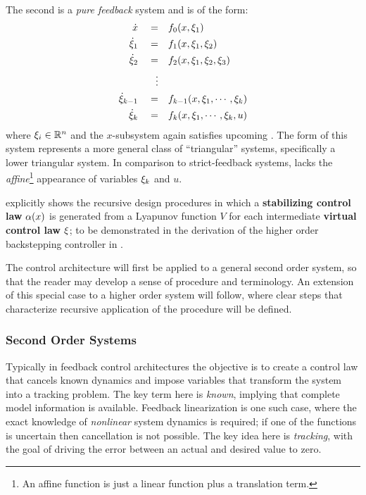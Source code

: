 \documentclass[12pt]{ucthesis}
\begin{document}
\begin{defn} \label{defn: pure_fb} ~\\
The second is a \textit{pure feedback} system and is of the form:
	\begin{equation} \label{eq: sys_pure_fb}
		\begin{aligned}
			\dot{x} 			\quad =& \quad  	f_0(x,\xi_1)  				\\
			\dot{\xi}_1 		\quad =& \quad  	f_1(x,\xi_1,\xi_2)  				\\
			\dot{\xi}_2 		\quad =& \quad 		f_2(x,\xi_1,\xi_2,\xi_3)  		\\
								\quad \vdots  													\\
			\dot{\xi}_{k-1}  	\quad =& \quad  	f_{k-1}(x,\xi_1,\cdots,\xi_k)  	\\
			\dot{\xi}_{k} 	\quad =& \quad  	f_k(x,\xi_1,\cdots,\xi_{k},u)
		\end{aligned}
	\end{equation}
where $\xi_i \in \mathbb{R}^n$ and the $x$-subsystem again satisfies upcoming . The form of this system represents a more general class of ``triangular'' systems, specifically a lower triangular system. In comparison to strict-feedback systems,  lacks the \textit{affine}\footnote{An affine function is just a linear function plus a translation term.} appearance of variables $\xi_k$ and $u$. 
\end{defn}

\citet[Sec. 2.3]{Krstic95} explicitly shows the recursive design procedures in which a \textbf{stabilizing control law} $\alpha(x)$ is generated from a Lyapunov function $V$ for each intermediate \textbf{virtual control law} $\xi$; to be demonstrated in the derivation of the higher order backstepping controller in .

The control architecture will first be applied to a general second order system, so that the reader may develop a sense of procedure and terminology. An extension of this special case to a higher order system will follow, where clear steps that characterize recursive application of the procedure will be defined.

\subsubsection{Second Order Systems}
\label{subsub: backstep_second}
Typically in feedback control architectures the objective is to create a control law that cancels known dynamics and impose variables that transform the system into a tracking problem. The key term here is \textit{known}, implying that complete model information is available. Feedback linearization is one such case, where the exact knowledge of \textit{nonlinear} system dynamics is required; if one of the functions is uncertain then cancellation is not possible. The key idea here is \textit{tracking}, with the goal of driving the error between an actual and desired value to zero.
\end{document}
